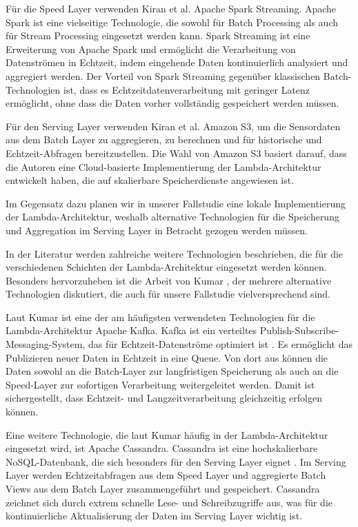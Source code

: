 Für die Speed Layer verwenden Kiran et al. \cite{kiran2015lambda} Apache Spark Streaming. Apache Spark ist eine vielseitige Technologie, die sowohl für Batch Processing als auch für Stream Processing eingesetzt werden kann. Spark Streaming ist eine Erweiterung von Apache Spark und ermöglicht die Verarbeitung von Datenströmen in Echtzeit, indem eingehende Daten kontinuierlich analysiert und aggregiert werden.
Der Vorteil von Spark Streaming gegenüber klassischen Batch-Technologien ist, dass es Echtzeitdatenverarbeitung mit geringer Latenz ermöglicht, ohne dass die Daten vorher vollständig gespeichert werden müssen.

Für den Serving Layer verwenden Kiran et al. \cite{kiran2015lambda} Amazon S3, um die Sensordaten aus dem Batch Layer zu aggregieren, zu berechnen und für historische und Echtzeit-Abfragen bereitzustellen. Die Wahl von Amazon S3 basiert darauf, dass die Autoren eine Cloud-basierte Implementierung der Lambda-Architektur entwickelt haben, die auf skalierbare Speicherdienste angewiesen ist.

Im Gegensatz dazu planen wir in unserer Fallstudie eine lokale Implementierung der Lambda-Architektur, weshalb alternative Technologien für die Speicherung und Aggregation im Serving Layer in Betracht gezogen werden müssen.

In der Literatur werden zahlreiche weitere Technologien beschrieben, die für die verschiedenen Schichten der Lambda-Architektur eingesetzt werden können. Besonders hervorzuheben ist die Arbeit von Kumar \cite{kumar2020lambda}, der mehrere alternative Technologien diskutiert, die auch für unsere Fallstudie vielversprechend sind.

Laut Kumar \cite{kumar2020lambda} ist eine der am häufigsten verwendeten Technologien für die Lambda-Architektur Apache Kafka. Kafka ist ein verteiltes Publish-Subscribe-Messaging-System, das für Echtzeit-Datenströme optimiert ist \cite{kreps2011kafka}. Es ermöglicht das Publizieren neuer Daten in Echtzeit in eine Queue. Von dort aus können die Daten sowohl an die Batch-Layer zur langfristigen Speicherung als auch an die Speed-Layer zur sofortigen Verarbeitung weitergeleitet werden. Damit ist sichergestellt, dass Echtzeit- und Langzeitverarbeitung gleichzeitig erfolgen können.

Eine weitere Technologie, die laut Kumar \cite{kumar2020lambda} häufig in der Lambda-Architektur eingesetzt wird, ist Apache Cassandra. Cassandra ist eine hochskalierbare NoSQL-Datenbank, die sich besonders für den Serving Layer eignet \cite{warren2015big}. Im Serving Layer werden Echtzeitabfragen aus dem Speed Layer und aggregierte Batch Views aus dem Batch Layer zusammengeführt und gespeichert. Cassandra zeichnet sich durch extrem schnelle Lese- und Schreibzugriffe aus, was für die kontinuierliche Aktualisierung der Daten im Serving Layer wichtig ist.

